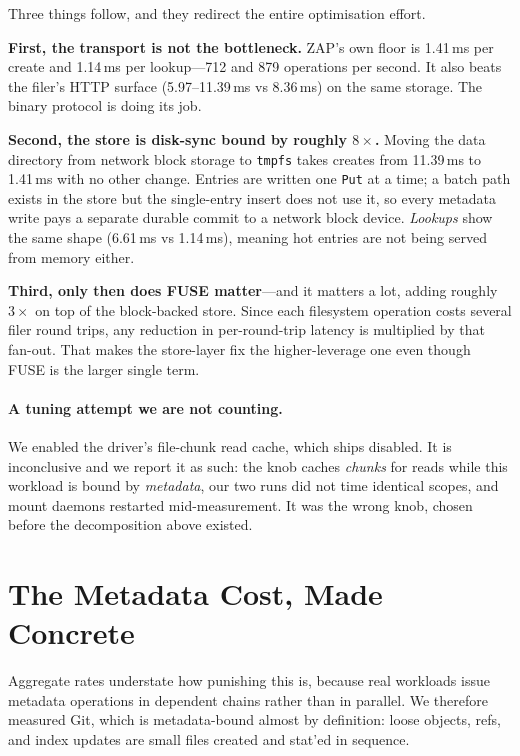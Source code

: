 \documentclass[11pt]{article}
\begin{document}
Three things follow, and they redirect the entire optimisation effort.

\textbf{First, the transport is not the bottleneck.} ZAP's own floor is
1.41\,ms per create and 1.14\,ms per lookup---712 and 879 operations per
second. It also beats the filer's HTTP surface (5.97--11.39\,ms vs
8.36\,ms) on the same storage. The binary protocol is doing its job.

\textbf{Second, the store is disk-sync bound by roughly \(8\times\).}
Moving the data directory from network block storage to \texttt{tmpfs} takes
creates from 11.39\,ms to 1.41\,ms with no other change. Entries are written
one \texttt{Put} at a time; a batch path exists in the store but the
single-entry insert does not use it, so every metadata write pays a separate
durable commit to a network block device. \emph{Lookups} show the same shape
(6.61\,ms vs 1.14\,ms), meaning hot entries are not being served from memory
either.

\textbf{Third, only then does FUSE matter}---and it matters a lot, adding
roughly \(3\times\) on top of the block-backed store. Since each filesystem
operation costs several filer round trips, any reduction in per-round-trip
latency is multiplied by that fan-out. That makes the store-layer fix the
higher-leverage one even though FUSE is the larger single term.

\paragraph{A tuning attempt we are not counting.} We enabled the driver's
file-chunk read cache, which ships disabled. It is inconclusive and we report
it as such: the knob caches \emph{chunks} for reads while this workload is
bound by \emph{metadata}, our two runs did not time identical scopes, and
mount daemons restarted mid-measurement. It was the wrong knob, chosen before
the decomposition above existed.

\section{The Metadata Cost, Made Concrete}

Aggregate rates understate how punishing this is, because real workloads
issue metadata operations in dependent chains rather than in parallel. We
therefore measured Git, which is metadata-bound almost by definition: loose
objects, refs, and index updates are small files created and stat'ed in
sequence.
\end{document}
